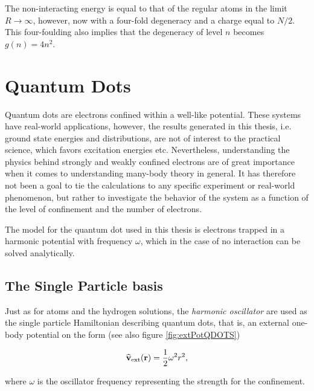 The non-interacting energy is equal to that of the regular atoms in the limit $R\to\infty$, however, now with a four-fold degeneracy and a charge equal to $N/2$. This four-foulding also implies that the degeneracy of level $n$ becomes $g(n) = 4n^2$.

\section{Quantum Dots}

Quantum dots are electrons confined within a well-like potential. These systems have real-world applications, however, the results generated in this thesis, i.e. ground state energies and distributions, are not of interest to the practical science, which favors excitation energies etc. Nevertheless, understanding the physics behind strongly and weakly confined electrons are of great importance when it comes to understanding many-body theory in general. It has therefore not been a goal to tie the calculations to any specific experiment or real-world phenomenon, but rather to investigate the behavior of the system as a function of the level of confinement and the number of electrons.

The model for the quantum dot used in this thesis is electrons trapped in a harmonic potential with frequency $\omega$, which in the case of no interaction can be solved analytically. 

\subsection{The Single Particle basis}

Just as for atoms and the hydrogen solutions, the \textit{harmonic oscillator} are used as the single particle Hamiltonian describing quantum dots, that is, an external one-body potential on the form (see also figure \ref{fig:extPotQDOTS})

\begin{equation}
 {\bf\widehat{v}}_\mathrm{ext}(\mathbf{r)} = \frac{1}{2}\omega^2r^2,
\end{equation}

where $\omega$ is the oscillator frequency representing the strength for the confinement.

